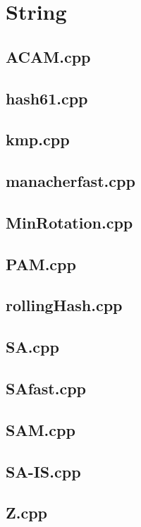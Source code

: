 \section{String}

\subsection{ACAM.cpp}


\subsection{hash61.cpp}


\subsection{kmp.cpp}


\subsection{manacherfast.cpp}


\subsection{MinRotation.cpp}


\subsection{PAM.cpp}


\subsection{rollingHash.cpp}


\subsection{SA.cpp}


\subsection{SAfast.cpp}


\subsection{SAM.cpp}


\subsection{SA-IS.cpp}


\subsection{Z.cpp}


